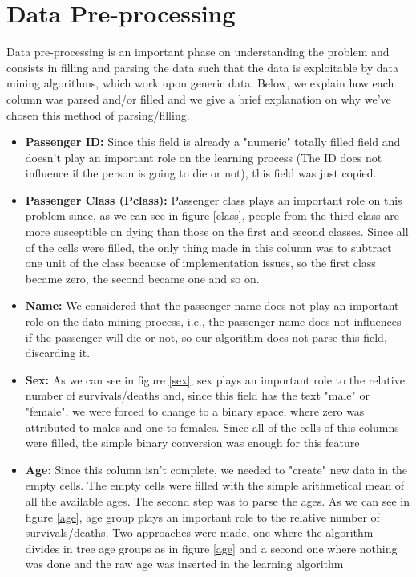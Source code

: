 \documentclass[12pt,a4paper]{article}
\begin{document}
\section{Data Pre-processing} 
Data pre-processing is an important phase on understanding the problem and consists in filling and parsing the data such that the data is exploitable by data mining algorithms, which work upon generic data. Below, we explain how each column was parsed and/or filled and we give a brief explanation on why we've chosen this method of parsing/filling.
\begin{itemize}
\item \textbf{Passenger ID:} Since this field is already a "numeric" totally filled field and doesn't play an important role on the learning process (The ID does not influence if the person is going to die or not), this field was just copied.

\item \textbf{Passenger Class (Pclass):} Passenger class plays an important role on this problem since, as we can see in figure \ref{class}, people from the third class are more susceptible on dying than those on the first and second classes. Since all of the cells were filled, the only thing made in this column was to subtract one unit of the class because of implementation issues, so the first class became zero, the second became one and so on.

\item \textbf{Name:} We considered that the passenger name does not play an important role on the data mining process, i.e., the passenger name does not influences if the passenger will die or not, so our algorithm does not parse this field, discarding it.

\item \textbf{Sex:} As we can see in figure \ref{sex}, sex plays an important role to the relative number of survivals/deaths and, since this field has the text "male" or "female", we were forced to change to a binary space, where zero was attributed to males and one to females. Since all of the cells of this columns were filled, the simple binary conversion was enough for this feature

\item \textbf{Age:} Since this column isn't complete, we needed to "create" new data in the empty cells. The empty cells were filled with the simple arithmetical mean of all the available ages. The second step was to parse the ages. As we can see in figure \ref{age}, age group plays an important role to the relative number of survivals/deaths. Two approaches were made, one where the algorithm divides in tree age groups as in figure \ref{age} and a second one where nothing was done and the raw age was inserted in the learning algorithm


\end{itemize}
\end{document}

